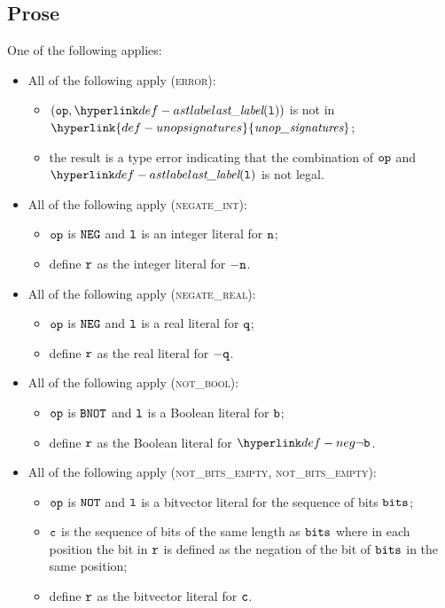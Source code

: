 \documentclass{book}
\newcommand\unopsignatures[0]{\hyperlink{def-unopsignatures}{\textfunc{unop\_signatures}}}
\begin{document}
\subsection{Prose}
One of the following applies:
\begin{itemize}
  \item All of the following apply (\textsc{error}):
  \begin{itemize}
    \item $(\op, \astlabel(\vl))$ is not in $\unopsignatures$;
    \item the result is a type error indicating that the combination of $\texttt{op}$ and $\astlabel(\vl)$
          is not legal.
  \end{itemize}

  \item All of the following apply (\textsc{negate\_int}):
  \begin{itemize}
    \item $\texttt{op}$ is $\texttt{NEG}$ and $\texttt{l}$ is an integer literal for $\texttt{n}$;
    \item define $\texttt{r}$ as the integer literal for $- \texttt{n}$.
  \end{itemize}

  \item All of the following apply (\textsc{negate\_real}):
  \begin{itemize}
    \item $\texttt{op}$ is $\texttt{NEG}$ and $\texttt{l}$ is a real literal for $\texttt{q}$;
    \item define $\texttt{r}$ as the real literal for $- \texttt{q}$.
  \end{itemize}

  \item All of the following apply (\textsc{not\_bool}):
  \begin{itemize}
    \item $\texttt{op}$ is $\texttt{BNOT}$ and $\texttt{l}$ is a Boolean literal for $\texttt{b}$;
    \item define $\texttt{r}$ as the Boolean literal for $\neg\vb$.
  \end{itemize}

  \item All of the following apply (\textsc{not\_bits\_empty}, \textsc{not\_bits\_empty}):
  \begin{itemize}
    \item $\texttt{op}$ is $\texttt{NOT}$ and $\texttt{l}$ is a bitvector literal for the sequence of bits $\texttt{bits}$;
    \item $\texttt{c}$ is the sequence of bits of the same length as $\texttt{bits}$ where in each position
          the bit in $\texttt{r}$ is defined as the negation of the bit of $\texttt{bits}$ in the same position;
    \item define $\texttt{r}$ as the bitvector literal for $\texttt{c}$.
  \end{itemize}
\end{itemize}
\end{document}
